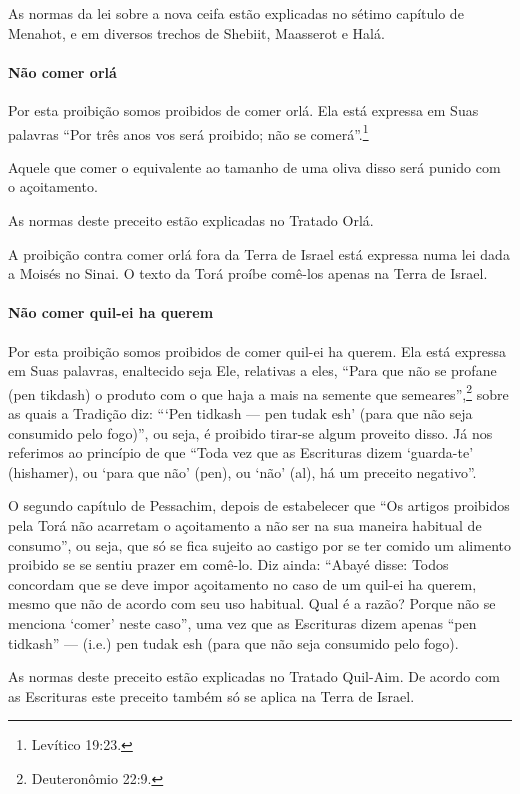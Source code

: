 As normas da lei sobre a nova ceifa estão explicadas no sétimo capítulo
de Menahot, e em diversos trechos de Shebiit, Maasserot e Halá.

\paragraph{Não comer orlá}

Por esta proibição somos proibidos de comer orlá. Ela está expressa
em Suas palavras ``Por três anos vos será proibido; não se comerá''.\footnote{Levítico 19:23.}

Aquele que comer o equivalente ao tamanho de uma oliva disso será punido
com o açoitamento.

As normas deste preceito estão explicadas no Tratado Orlá.

A proibição contra comer orlá fora da Terra de Israel está expressa
numa lei dada a Moisés no Sinai. O texto da Torá proíbe comê-los apenas
na Terra de Israel.

\paragraph{Não comer quil-ei ha querem}

Por esta proibição somos proibidos de comer quil-ei ha querem. Ela
está expressa em Suas palavras, enaltecido seja Ele, relativas a eles,
``Para que não se profane (pen tikdash) o produto com o que haja a mais
na semente que semeares'',\footnote{Deuteronômio 22:9.} sobre as quais a Tradição
diz: ```Pen tidkash --- pen tudak esh' (para que não seja consumido
pelo fogo)'', ou seja, é proibido tirar-se algum proveito disso. Já nos
referimos ao princípio de que ``Toda vez que as Escrituras dizem
`guarda-te' (hishamer), ou `para que não' (pen), ou `não' (al), há um
preceito negativo''.

O segundo capítulo de Pessachim, depois de estabelecer que ``Os artigos
proibidos pela Torá não acarretam o açoitamento a não ser na sua
maneira habitual de consumo'', ou seja, que só se fica sujeito ao
castigo por se ter comido um alimento proibido se se sentiu prazer em
comê-lo. Diz ainda: ``Abayé disse: Todos concordam que se deve impor
açoitamento no caso de um quil-ei ha querem, mesmo que não de acordo
com seu uso habitual. Qual é a razão? Porque não se menciona `comer'
neste caso'', uma vez que as Escrituras dizem apenas ``pen tidkash''
--- (i.e.) pen tudak esh (para que não seja consumido pelo fogo).

As normas deste preceito estão explicadas no Tratado Quil-Aim. De acordo
com as Escrituras este preceito também só se aplica na Terra de Israel.


